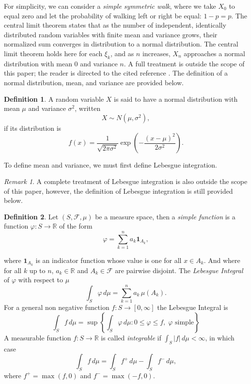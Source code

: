 \documentclass[12pt]{article}
\theoremstyle{definition}
\newtheorem{definition}{Definition}[section]
\theoremstyle{plain}
\theoremstyle{remark}
\newtheorem{remark}{Remark}
\begin{document}
For simplicity, we can consider a \textit{simple symmetric walk}, where we take $X_0$ to equal zero and let the probability of walking left or right be equal: $1-p=p$.  
The central limit theorem states that as the number of independent, identically distributed random variables with finite mean and variance grows, their normalized sum converges in distribution to a normal distribution.  The central limit theorem holds here for each $\xi_k$, and as $n$ increases, $X_n$ approaches a normal distribution with mean $0$ and variance $n$. A full treatment is outside the scope of this paper; the reader is directed to the cited reference \cite{CentralLimit}.  The definition of a normal distribution, mean, and variance are provided below.

\begin{definition}
A random variable $X$ is said to have a normal distribution with mean $\mu$ and variance $\sigma^2$, written
\[
X \sim N(\mu,\sigma^2),
\]
if its distribution is
\[
f(x)=
\frac{1}{\sqrt{2\pi\sigma^2}}
\exp\left(
-\frac{(x-\mu)^2}{2\sigma^2}
\right).
\]
\end{definition}

To define mean and variance, we must first define Lebesgue integration.  
\begin{remark}
A complete treatment of Lebesgue integration is also outside the scope of this paper, however, the definition of Lebesgue integration is still provided below.
\end{remark}

\begin{definition}
Let $(S, \mathcal{F}, \mu)$ be a measure space, then a \textit{simple function} is a function $\varphi: S \to \mathbb{R}$ of the form
\[
    \varphi = \sum_{k=1}^{n} a_k \mathbf{1}_{A_k},
\]

where $\mathbf{1}_{A_k}$ is an indicator function whose value is one for all $x \in A_k$. And where for all $k$ up to $n$, $a_k \in \mathbb{R}$ and $A_k \in \mathcal{F}$ are pairwise disjoint.  The \textit{Lebesgue Integral} of $\varphi$ with respect to $\mu$
\[
    \int_S \varphi \, d\mu = \sum_{k=1}^{n} a_k \, \mu(A_k).
\]
For a general non negative function $f: S \to [0,\infty]$ the Lebesgue Integral is
\[
 \int_S f \, d\mu = \sup \left\{ \int_S \varphi \, d\mu  :  0 \leq \varphi \leq f,\; \varphi \text{ simple} \right\}
\]
A measurable function $f: S \to \mathbb{R}$ is called \textit{integrable} if
$\int_S |f| \, d\mu < \infty$, in which case
\[
    \int_S f \, d\mu = \int_S f^+ \, d\mu - \int_S f^- \, d\mu,
\]
where $f^+ = \max(f,0)$ and $f^- = \max(-f,0)$.
\end{definition}
\end{document}
